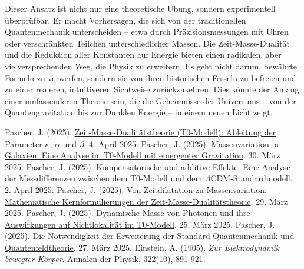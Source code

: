 \documentclass[a4paper,12pt]{article}
\begin{document}
	Dieser Ansatz ist nicht nur eine theoretische Übung, sondern experimentell überprüfbar. Er macht Vorhersagen, die sich von der traditionellen Quantenmechanik unterscheiden – etwa durch Präzisionsmessungen mit Uhren oder verschränkten Teilchen unterschiedlicher Massen. Die Zeit-Masse-Dualität und die Reduktion aller Konstanten auf Energie bieten einen radikalen, aber vielversprechenden Weg, die Physik zu erweitern. Es geht nicht darum, bewährte Formeln zu verwerfen, sondern sie von ihren historischen Fesseln zu befreien und zu einer realeren, intuitiveren Sichtweise zurückzukehren. Dies könnte der Anfang einer umfassenderen Theorie sein, die die Geheimnisse des Universums – von der Quantengravitation bis zur Dunklen Energie – in einem neuen Licht zeigt.
	
	\begin{thebibliography}{99}
		 Pascher, J. (2025). \href{https://github.com/jpascher/T0-Time-Mass-Duality/tree/main/2/pdf/Deutsch/ZeitMasseT0Params.pdf}{Zeit-Masse-Dualitätstheorie (T0-Modell): Ableitung der Parameter \(\kappa\), \(\alpha\) und \(\beta\)}. 4. April 2025.
		 Pascher, J. (2025). \href{https://github.com/jpascher/T0-Time-Mass-Duality/tree/main/2/pdf/Deutsch/MassVarGalaxien.pdf}{Massenvariation in Galaxien: Eine Analyse im T0-Modell mit emergenter Gravitation}. 30. März 2025.
		 Pascher, J. (2025). \href{https://github.com/jpascher/T0-Time-Mass-Duality/tree/main/2/pdf/Deutsch/MessdifferenzenT0Standard.pdf}{Kompensatorische und additive Effekte: Eine Analyse der Messdifferenzen zwischen dem T0-Modell und dem \(\Lambda\)CDM-Standardmodell}. 2. April 2025.
		 Pascher, J. (2025). \href{https://github.com/jpascher/T0-Time-Mass-Duality/tree/main/2/pdf/Deutsch/MathZeitMasseLagrange.pdf}{Von Zeitdilatation zu Massenvariation: Mathematische Kernformulierungen der Zeit-Masse-Dualitätstheorie}. 29. März 2025.
		 Pascher, J. (2025). \href{https://github.com/jpascher/T0-Time-Mass-Duality/tree/main/2/pdf/Deutsch/DynMassePhotonenNichtlokal.pdf}{Dynamische Masse von Photonen und ihre Auswirkungen auf Nichtlokalität im T0-Modell}. 25. März 2025.
		 Pascher, J. (2025). \href{https://github.com/jpascher/T0-Time-Mass-Duality/tree/main/2/pdf/Deutsch/NotwendigkeitQMErweiterung.pdf}{Die Notwendigkeit der Erweiterung der Standard-Quantenmechanik und Quantenfeldtheorie}. 27. März 2025.
		 Einstein, A. (1905). \textit{Zur Elektrodynamik bewegter Körper}. Annalen der Physik, 322(10), 891-921.
	\end{thebibliography}
	
\end{document}
